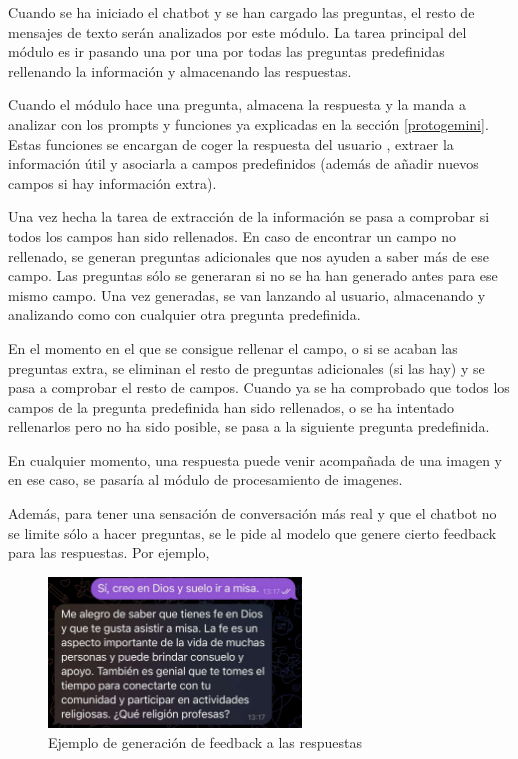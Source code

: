 Cuando se ha iniciado el chatbot y se han cargado las preguntas, el resto de mensajes de texto serán analizados por este módulo. La tarea principal del módulo es ir pasando una por una por todas las preguntas predefinidas rellenando la información y almacenando las respuestas. 

Cuando el módulo hace una pregunta, almacena la respuesta y la manda a analizar con los prompts y funciones ya explicadas en la sección \ref{protogemini}. Estas funciones se encargan de coger la respuesta del usuario , extraer la información útil y asociarla a campos predefinidos (además de añadir nuevos campos si hay información extra).

Una vez hecha la tarea de extracción de la información se pasa a comprobar si todos los campos han sido rellenados. En caso de encontrar un campo no rellenado, se generan preguntas adicionales que nos ayuden a saber más de ese campo. Las preguntas sólo se generaran si no se ha han generado antes para ese mismo campo. Una vez generadas, se van lanzando al usuario, almacenando y analizando como con cualquier otra pregunta predefinida. 

En el momento en el que se consigue rellenar el campo, o si se acaban las preguntas extra, se eliminan el resto de preguntas adicionales (si las hay) y se pasa a comprobar el resto de campos. Cuando ya se ha comprobado que todos los campos de la pregunta predefinida han sido rellenados, o se ha intentado rellenarlos pero no ha sido posible, se pasa a la siguiente pregunta predefinida. 

En cualquier momento, una respuesta puede venir acompañada de una imagen y en ese caso, se pasaría al módulo de procesamiento de imagenes.

Además, para tener una sensación de conversación más real y que el chatbot no se limite sólo a hacer preguntas, se le pide al modelo que genere cierto feedback para las respuestas. Por ejemplo, 

\begin{figure}[h]
	\centering
	\includegraphics[width=0.6\textwidth]{Imagenes/feedback}
	\caption{Ejemplo de generación de feedback a las respuestas}
	\label{fig:feedback}
\end{figure}


